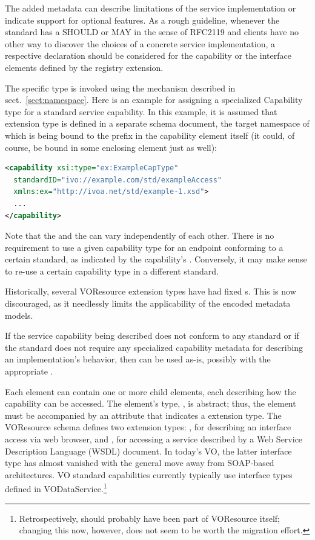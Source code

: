 \documentclass[11pt,a4paper]{ivoa}
\begin{document}
The added metadata can describe
limitations of the service implementation or indicate support for
optional features.  As a rough guideline, whenever the standard has a
SHOULD or MAY in the sense of RFC2119 and clients have no other way to
discover the choices of a concrete service implementation, a respective
declaration should be considered for the capability or the interface
elements defined by the registry extension.

The specific  type is invoked
using the  mechanism described in
sect.~\ref{sect:namespace}.
Here is an example for assigning a specialized Capability type for
a standard service capability.  In this example, it is assumed that
 extension type is defined in a separate
schema document, the target namespace of which is being bound to the
 prefix in the capability element itself (it could, of
course, be bound in some enclosing element just as well):

\begin{lstlisting}[language=XML]
<capability xsi:type="ex:ExampleCapType"
  standardID="ivo://example.com/std/exampleAccess"
  xmlns:ex="http://ivoa.net/std/example-1.xsd">
  ...
</capability>
\end{lstlisting}

Note that the  and the  can vary
independently of each other.  There is no requirement to use a given
capability type for an endpoint conforming to a certain standard, as
indicated by the capability's . Conversely,
it may make sense to re-use a certain capability type in a different
standard.

Historically, several VOResource extension types have had
fixed s.  This is now discouraged, as it needlessly
limits the applicability of the encoded metadata models.

If the service capability being described does not conform to any
standard or if the standard does not require any specialized
capability metadata for describing an implementation's behavior, then
 can be used as-is, possibly with the appropriate
.


Each  element can contain one or more child
 elements, each describing how the capability
can be accessed.  The  element's type,
, is abstract; thus, the
 element must be accompanied by an
 attribute that indicates a
 extension type.  The VOResource schema
defines two  extension types:
, for describing an interface access via web
browser, and , for accessing a service
described by a Web Service Description Language (WSDL) document.  In
today's VO, the latter interface type has almost vanished with the
general move away from SOAP-based architectures.  VO standard
capabilities currently typically use interface types defined in
VODataService.\footnote{Retrospectively,  should probably
have been part of VOResource itself; changing this now, however, does
not seem to be worth the migration effort.}
\end{document}

